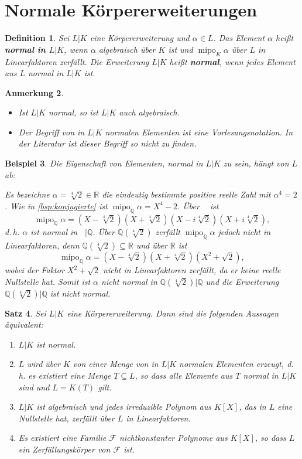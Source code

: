 \documentclass[a4paper, twoside, 11pt, ngerman]{report}
\newcommand{\QQ}{\mathds Q}
\newcommand{\RR}{\mathds R}
\newcommand{\calF}{\mathcal F}
\DeclareMathOperator{\alg}{alg}
\DeclareMathOperator{\mipo}{mipo}
\DeclareMathOperator{\QQalg}{\QQ^{\alg}}
\theoremstyle{definistyle}
\newtheorem{satz}{Satz}[section]
\newtheorem{defini}[satz]{Definition}
\newtheorem{anm}[satz]{Anmerkung}
\newtheorem{bsp}[satz]{Beispiel}
\theoremstyle{remark}
\newcommand{\defn}[1]{\textit{\bfseries #1}}
\begin{document}
\section{Normale Körpererweiterungen}

\begin{defini}\label{def:normale_koerpererw}
Sei $L|K$ eine Körpererweiterung und $\alpha \in L$. Das Element $\alpha$ heißt \defn{normal in $L|K$}, wenn
$\alpha$ algebraisch über $K$ ist und $\mipo_K\alpha$ über $L$ in Linearfaktoren zerfällt.
Die Erweiterung $L|K$ heißt \defn{normal}, wenn jedes Element aus $L$ normal in $L|K$ ist.
\end{defini}

\begin{anm}
\begin{itemize}
\item Ist $L|K$ normal, so ist $L|K$ auch algebraisch.
\item Der Begriff von in $L|K$ normalen Elementen ist eine Vorlesungsnotation. In der Literatur ist dieser Begriff so nicht zu finden.
\end{itemize}
\end{anm}

\begin{bsp}\label{bsp:normalitaet_haengt_von_L_ab}
Die Eigenschaft von Elementen, normal in $L|K$ zu sein, hängt von $L$ ab:

Es bezeichne $\alpha=\sqrt[4]{2}\in\RR$ die eindeutig bestimmte positive reelle Zahl mit $\alpha^4=2$. Wie in \ref{bsp:konjugierte} ist  $\mipo_\QQ\alpha=X^4-2$.
Über $\QQalg$ ist
\[
\mipo_\QQ\alpha = (X - \sqrt[4]{2})(X + \sqrt[4]{2})(X - i\sqrt[4]{2})(X + i\sqrt[4]{2}),
\]
d.\,h. $\alpha$ ist normal in $\QQalg|\QQ$. Über $\QQ(\sqrt[4]{2})$ zerfällt $\mipo_\QQ\alpha$ jedoch nicht in Linearfaktoren, denn $\QQ(\sqrt[4]{2}) \subseteq \mathbb{R}$ und über $\RR$ ist
\[
\mipo_\QQ\alpha = (X - \sqrt[4]{2})(X + \sqrt[4]{2})(X^2+\sqrt{2}),
\]
wobei der Faktor $X^2+\sqrt{2}$ nicht in Linearfaktoren zerfällt, da er keine reelle Nullstelle hat.
Somit ist $\alpha$ nicht normal in $\QQ(\sqrt[4]{2})|\QQ$ und die Erweiterung $\QQ(\sqrt[4]{2})|\QQ$ ist nicht normal.
\end{bsp}

\begin{satz}\label{satz:normal_aequiv}
Sei $L|K$ eine Körpererweiterung. Dann sind die folgenden Aussagen äquivalent:
\begin{enumerate}
\item[(i)] $L|K$ ist normal.
\item[(ii)] $L$ wird über $K$ von einer Menge von in $L|K$ normalen Elementen erzeugt, d.\,h. es existiert eine Menge $T \subseteq L$, so dass alle Elemente aus $T$ normal in $L|K$ sind und $L = K(T)$ gilt.
\item[(iii)] $L|K$ ist algebraisch und jedes irreduzible Polynom aus $K[X]$, das in $L$ eine Nullstelle hat, zerfällt über $L$ in Linearfaktoren.
\item[(iv)] Es existiert eine Familie $\calF$ nichtkonstanter Polynome aus $K[X]$, so dass $L$ ein Zerfällungskörper von $\calF$ ist.
\end{enumerate}
\end{satz}
\end{document}
